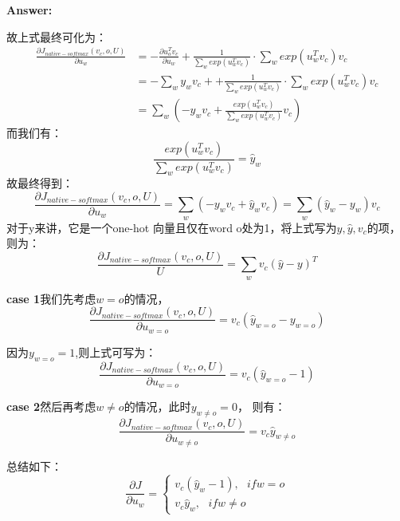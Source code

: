 \documentclass{article}
\newenvironment{answer}{
    {\bf Answer:} \sf \begingroup \color{red}%
}{\par\endgroup}%
\begin{document}
\begin{enumerate}[label=(\alph*)]
\begin{shaded}
\begin{answer}
故上式最终可化为：
\begin{equation}
\begin{array}{cl}
	\frac{\partial J_{native-softmax}(v_c,o,U)}{\partial u_w} &= -\frac{\partial u_o^T v_c}{\partial u_w} +\frac{1}{\sum_w exp(u_w^T v_c)} \cdot \sum_w exp(u_w^T v_c) v_c\\
	&= -\sum_w y_w v_c+  + \frac{1}{\sum_w exp(u_w^T v_c)} \cdot \sum_w exp(u_w^T v_c) v_c \\
	&= \sum_w (-y_w v_c + \frac{exp(u_w^T v_c)}{\sum_w exp(u_w^T v_c)} v_c)
\end{array}
\end{equation}
而我们有：
\begin{equation}
	\frac{exp(u_w^T v_c)}{\sum_w exp(u_w^T v_c)} = \hat{y}_w
\end{equation}
故最终得到：
\begin{equation}
	\frac{\partial J_{native-softmax}(v_c,o,U)}{\partial u_w} = \sum_w (-y_w v_c +\hat{y}_w v_c) = \sum_w(\hat{y}_w - y_w)v_c
\end{equation}
对于y来讲，它是一个one-hot 向量且仅在word o处为1，将上式写为$y,\hat{y},v_c$的项，则为：
\begin{equation}
	\frac{\partial J_{native-softmax}(v_c,o,U)}{U} =  \sum_w v_c(\hat{y} - y)^T
\end{equation}

\textbf{case 1}我们先考虑$w=o$的情况，
\begin{equation}
	\frac{\partial J_{native-softmax}(v_c,o,U)}{\partial u_{w=o}} = v_c (\hat{y}_{w=o} - y_{w=o})
\end{equation}

因为$y_{w=o}=1$,则上式可写为：
\begin{equation}
	\frac{\partial J_{native-softmax}(v_c,o,U)}{\partial u_{w=o}} = v_c (\hat{y}_{w=o} - 1)
\end{equation}

\textbf{case 2}然后再考虑$w\neq o$的情况，此时$y_{w\neq o}=0$，
则有：
\begin{equation}
		\frac{\partial J_{native-softmax}(v_c,o,U)}{\partial u_{w\neq o}} = v_c \hat{y}_{w\neq o}
\end{equation}

总结如下：
\begin{equation}
	\frac{\partial J}{\partial u_w} = \left\{
	\begin{array}{l}
		v_c (\hat{y}_{w} - 1),\ \ \ if w=o \\
		v_c \hat{y}_{w}, \ \ \ if w\neq o
	\end{array}
	\right.
\end{equation}
\end{answer}
\end{shaded}


\end{enumerate}
\end{document}
